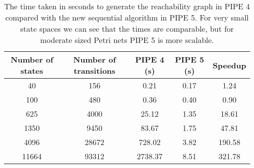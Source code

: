 \begin{table}[tb]
\begin{center}
  \begin{tabular}{| c | c | c | c | c | }
  \hline
    Number of states & Number of transitions & PIPE 4 (s) & PIPE 5 (s) & Speedup \\
    \hline
    40 & 156 & 0.21 & 0.17 & 1.24\\
    \hline
    100 & 480 & 0.36 & 0.40 & 0.90\\
    \hline
    \num{625} & \num{4000} & \num{25.12} & \num{1.35} & \num{18.61}\\
    \hline
    \num{1350} & \num{9450} & \num{83.67} & \num{1.75} & \num{47.81}\\
    \hline
    \num{4096} & \num{28672} & \num{728.02} & \num{3.82} & \num{190.58}\\
    \hline
    \num{11664} & \num{93312} & \num{2738.37} & \num{8.51} & \num{321.78}\\
    \hline
  \end{tabular}
\caption{The time taken in seconds to generate the reachability graph in PIPE 4 compared with the new sequential algorithm in PIPE 5. For very small state spaces we can see that the times are comparable, but for moderate sized Petri nets PIPE 5 is more scalable.}
\label{tbl:pipe5_vs_pipe4_sequential}
\end{center}
\end{table}